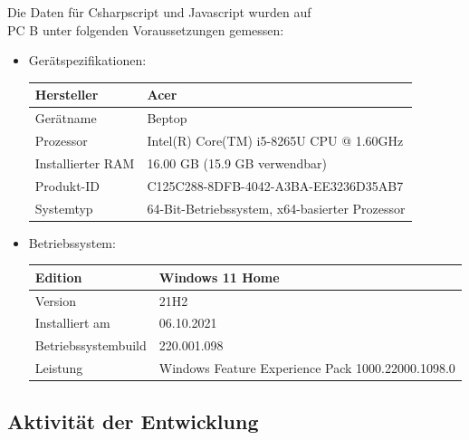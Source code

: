\newpage
Die Daten für Csharpscript und Javascript wurden auf \\
PC B unter folgenden Voraussetzungen  gemessen:
\begin{itemize}
    \item Gerätspezifikationen:
    \begin{table}[H]
        \center
        \begin{tabular}{|p{3cm}|p{3cm}|}
            \hline
            Hersteller & Acer \\ \hline
            Gerätname & Beptop \\ \hline
            Prozessor & Intel(R) Core(TM) i5-8265U CPU @ 1.60GHz \\ \hline
            Installierter RAM & 16.00 GB (15.9 GB verwendbar) \\ \hline
            Produkt-ID & C125C288-8DFB-4042-A3BA-EE3236D35AB7 \\ \hline
            Systemtyp & 64-Bit-Betriebssystem, x64-basierter Prozessor \\ \hline
        \end{tabular}
    \end{table}
    \item Betriebssystem:
    \begin{table}[H]
        \center
        \begin{tabular}{|p{4cm}|p{4cm}|}
            \hline
            Edition & Windows 11 Home \\ \hline
            Version & 21H2 \\ \hline
            Installiert am & 06.10.2021 \\ \hline
            Betriebssystembuild & 220.001.098 \\ \hline
            Leistung & Windows Feature Experience Pack 1000.22000.1098.0 \\ \hline
        \end{tabular}        
    \end{table}
\end{itemize}


\newpage
\subsection{Aktivität der Entwicklung}


